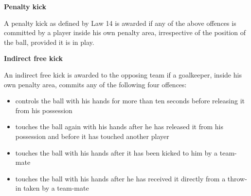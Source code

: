 {\bfseries Penalty kick}

\headlinebox

A penalty kick as defined by Law 14 is awarded if any of the above 
offences is committed by a player inside his own penalty area,
irrespective of the position of the ball, provided it is in play.


\bigskip

{\bfseries Indirect free kick}

\headlinebox

An indirect free kick is awarded to the opposing team if a goalkeeper, inside his own penalty area, commits any of the following four offences: 

\begin{itemize}
\item controls the ball with his hands for more than ten seconds before releasing it from his possession
\item touches the ball again with his hands after he has released it from his possession and before it has touched another player
\item touches the ball with his hands after it has been  kicked to him by a team-mate
\item touches the ball with his hands after he has received it directly from a throw-in taken by a team-mate
\end{itemize}

\bigskip



